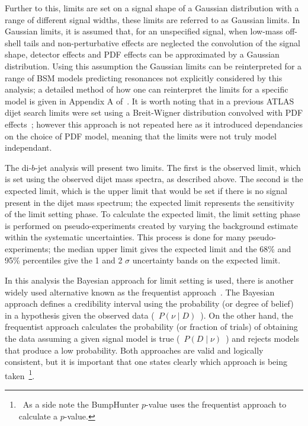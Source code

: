 Further to this, limits are set on a signal shape of a Gaussian distribution with a range of different signal widths,
these limits are referred to as Gaussian limits.
In Gaussian limits, it is assumed that, for an unspecified signal,
when low-mass off-shell tails and non-perturbative effects are neglected the convolution of the signal shape, detector effects and PDF effects
can be approximated by a Gaussian distribution.
Using this assumption the Gaussian limits can be reinterpreted for a range of BSM models predicting resonances not explicitly considered by this analysis;
a detailed method of how one can reinterpret the limits for a specific model is given in Appendix A of~\cite{lim-dijet-gaussian}.
It is worth noting that in a previous ATLAS dijet search limits were set using a Breit-Wigner distribution convolved with PDF effects~\cite{lim-dijet_BW};
however this approach is not repeated here as it introduced dependancies on the choice of PDF model, meaning that the limits were not truly model independant.

The di-$b$-jet analysis will present two limits.
The first is the observed limit, which is set using the observed dijet mass spectra, as described above.
The second is the expected limit, which is the upper limit that would be set if there is no signal present in the dijet mass spectrum;
the expected limit represents the sensitivity of the limit setting phase.
To calculate the expected limit, the limit setting phase is performed on pseudo-experiments
created by varying the background estimate within the systematic uncertainties.
This process is done for many pseudo-experiments; the median upper limit gives the expected limit
and the 68\% and 95\% percentiles give the 1 and 2 $\sigma$ uncertainty bands on the expected limit.

In this analysis the Bayesian approach for limit setting is used,
there is another widely used alternative known as the frequentist approach~\cite{lim-cowan}.
The Bayesian approach defines a credibility interval using the probability (or degree of belief) in a hypothesis given the observed data \mbox{( $P(\nu \mid D)$ )}.
On the other hand, the frequentist approach calculates the probability (or fraction of trials)
of obtaining the data assuming a given signal model is true \mbox{( $P(D \mid \nu)$ )} and rejects models that produce a low probability.
Both approaches are valid and logically consistent,
but it is important that one states clearly which approach is being taken~\footnote{\ As a side note the BumpHunter $p$-value uses the frequentist approach to calculate a $p$-value.}.

